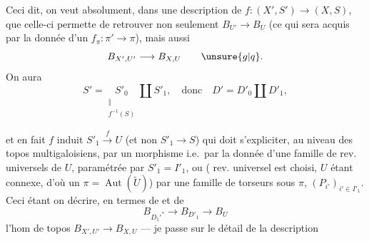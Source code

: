 Ceci dit, on veut absolument, dans une description de
$f:(X',S')\longrightarrow(X,S)$, que celle-ci permette de retrouver non seulement $B_{U'}\longrightarrow B_U$ (ce qui sera acquis par la donnée d'un $f_\pi:\pi'\longrightarrow\pi$), mais aussi
\[
B_{X',U'}\longrightarrow B_{X,U}\qquad\unsure{g|q}.
\]
On aura 
\[
S'=\underset{\substack{\Vert\\f^{-1}(S)}}{S'_0}\amalg S'_1,
\quad\text{donc}\quad D'=D'_0\amalg D'_1,
\]

et en fait $f$ induit $S'_1\xrightarrow{f}U$ (et non $S'_1\longrightarrow S$) qui doit s'expliciter, au niveau  des topos multigaloisiens, par un morphisme
i.e.\ par la donnée d'une famille de rev. universels de $U$, paramétrée par $S'_1=I'_1$, ou ( rev. universel est choisi, $U$ étant connexe, d'où un $\pi=\operatorname{Aut}(\widetilde U)$) par une famille de torseurs sous  $\pi$, $(P_{i'})_{i'\in I'_1}$.
Ceci étant   on  décrire, en termes de
et de
\[
B_{D_1'^*}\longrightarrow B_{D'_1}\longrightarrow B_U
\]
 l'hom de topos $B_{X',U'}\longrightarrow B_{X,U}$
--- je passe sur le détail de la description

